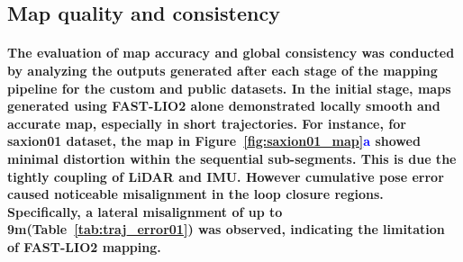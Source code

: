 %
\subsection{Map quality and consistency}
\paragraph{\textnormal{The evaluation of map accuracy and global consistency was conducted by analyzing the outputs generated after each stage of the mapping pipeline for the custom and public datasets. In the initial stage, maps generated using FAST-LIO2 alone demonstrated locally smooth and accurate map, especially in short trajectories. For instance, for saxion01 dataset, the map in Figure~\textcolor{blue}{\ref{fig:saxion01_map}a} showed minimal distortion within the sequential sub-segments. This is due the tightly coupling of LiDAR and IMU. However cumulative pose error caused noticeable misalignment in the loop closure regions. Specifically, a lateral misalignment of up to 9m(Table~\ref{tab:traj_error01}) was observed, indicating the limitation of FAST-LIO2 mapping.}}

